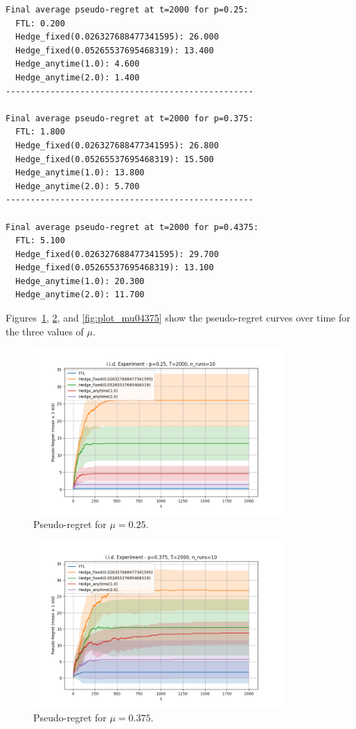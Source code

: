 \begin{verbatim}
Final average pseudo-regret at t=2000 for p=0.25:
  FTL: 0.200
  Hedge_fixed(0.026327688477341595): 26.000
  Hedge_fixed(0.05265537695468319): 13.400
  Hedge_anytime(1.0): 4.600
  Hedge_anytime(2.0): 1.400
--------------------------------------------------

Final average pseudo-regret at t=2000 for p=0.375:
  FTL: 1.800
  Hedge_fixed(0.026327688477341595): 26.800
  Hedge_fixed(0.05265537695468319): 15.500
  Hedge_anytime(1.0): 13.800
  Hedge_anytime(2.0): 5.700
--------------------------------------------------

Final average pseudo-regret at t=2000 for p=0.4375:
  FTL: 5.100
  Hedge_fixed(0.026327688477341595): 29.700
  Hedge_fixed(0.05265537695468319): 13.100
  Hedge_anytime(1.0): 20.300
  Hedge_anytime(2.0): 11.700
\end{verbatim}

Figures~\ref{fig:plot_mu025}, \ref{fig:plot_mu0375}, and \ref{fig:plot_mu04375} show the pseudo-regret curves over time for the three values of \(\mu\).  

\begin{figure}[H]
\centering
\includegraphics[width=0.85\textwidth]{Code/plot_iid_025.png}
\caption{Pseudo-regret for \(\mu=0.25\).}
\label{fig:plot_mu025}
\end{figure}

\begin{figure}[H]
\centering
\includegraphics[width=0.85\textwidth]{Code/plot_iid_0375.png}
\caption{Pseudo-regret for \(\mu=0.375\).}
\label{fig:plot_mu0375}
\end{figure}

